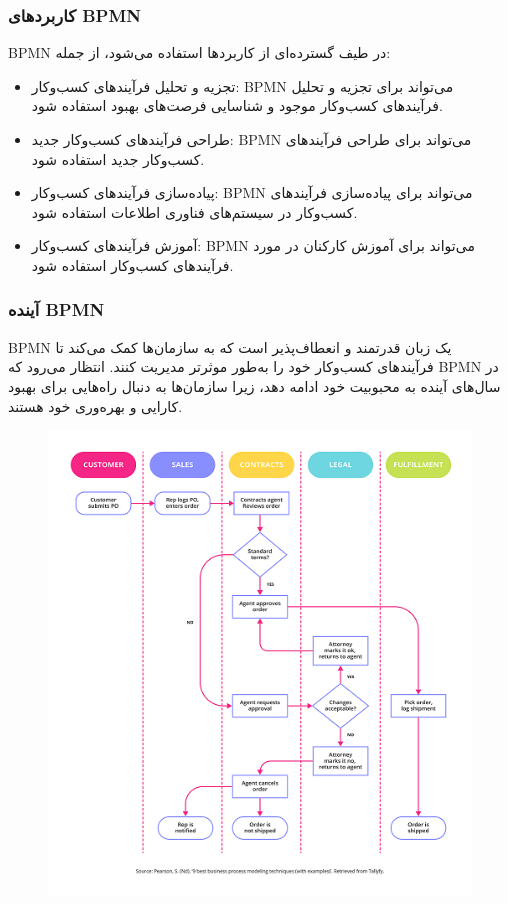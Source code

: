 \subsubsection*{کاربردهای BPMN}

BPMN در طیف گسترده‌ای از کاربردها استفاده می‌شود، از جمله:

\begin{itemize}
	\item تجزیه و تحلیل فرآیندهای کسب‌وکار: BPMN می‌تواند برای تجزیه و تحلیل فرآیندهای کسب‌وکار موجود و شناسایی فرصت‌های بهبود استفاده شود.
	\item طراحی فرآیندهای کسب‌وکار جدید: BPMN می‌تواند برای طراحی فرآیندهای کسب‌وکار جدید استفاده شود.
	\item پیاده‌سازی فرآیندهای کسب‌وکار: BPMN می‌تواند برای پیاده‌سازی فرآیندهای کسب‌وکار در سیستم‌های فناوری اطلاعات استفاده شود.
	\item آموزش فرآیندهای کسب‌وکار: BPMN می‌تواند برای آموزش کارکنان در مورد فرآیندهای کسب‌وکار استفاده شود.
\end{itemize}

\subsubsection*{آینده BPMN}

BPMN یک زبان قدرتمند و انعطاف‌پذیر است که به سازمان‌ها کمک می‌کند تا فرآیندهای کسب‌وکار خود را به‌طور موثرتر مدیریت کنند. انتظار می‌رود که BPMN در سال‌های آینده به محبوبیت خود ادامه دهد، زیرا سازمان‌ها به دنبال راه‌هایی برای بهبود کارایی و بهره‌وری خود هستند.


\begin{figure}[H]
	\centering
	\includegraphics{pic5.png}
	\label{fig:label4}
\end{figure}




